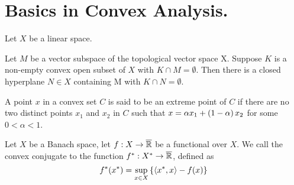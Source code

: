 \chapter{Basics in Convex Analysis.}
\begin{definition}[Variety]
\end{definition}
\begin{definition}[Convexity]
Let $X$ be a linear space. 
\end{definition}
\begin{definition}
\end{definition}
\begin{definition}
\end{definition}

\begin{theorem}
\end{theorem}

\begin{theorem}
	Let $M$ be a vector subspace of the topological vector space X. Suppose $K$ is a non-empty convex open subset of $X$ with $K\cap M=\emptyset$. Then there is a closed hyperplane $N \in X$ containing M with $K \cap N = \emptyset$.
\end{theorem}

\begin{definition}[Cone]
	
\end{definition}


\begin{definition}
A point $x$ in a convex set $C$ is said to be an extreme point of $C$ if there are no two distinct points $x_1$ and $x_2$ in $C$ such that $x = \alpha x_1 + \left( 1-\alpha \right)x_2$ for some $0<\alpha <1$.
\end{definition}

\begin{definition}
Let $X$ be a Banach space, let $f:X\rightarrow \overline{\mathbb{R}}$ be a functional over $X$. We call the convex conjugate to the function ${f}^*: {X}^*\rightarrow \overline{\mathbb{R}}$, defined as
\begin{equation*}
	{f}^*({x}^*)=\sup_{x\in X} \left\lbrace \left\langle {x}^*, x \right\rangle-f(x) \right\rbrace
\end{equation*}	
\end{definition}

